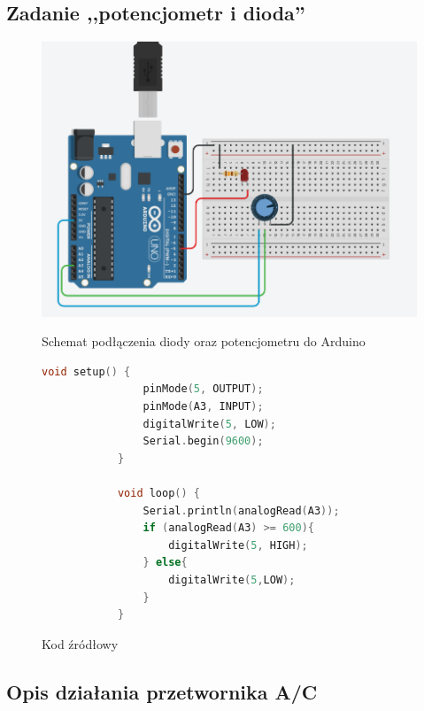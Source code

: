 \documentclass[12pt]{article}
\begin{document}
	\subsection{Zadanie ,,potencjometr i dioda''}
	\begin{figure}[h!]
		\begin{center}
			\includegraphics[scale=0.4]{03_serial_conn.png}
			\caption*{Schemat podłączenia diody oraz potencjometru do Arduino}
		\end{center}
		\begin{lstlisting}[language=C++]
			void setup() {
				pinMode(5, OUTPUT);
				pinMode(A3, INPUT);
				digitalWrite(5, LOW);
				Serial.begin(9600);
			}
			
			void loop() {
				Serial.println(analogRead(A3));
				if (analogRead(A3) >= 600){
					digitalWrite(5, HIGH);
				} else{
					digitalWrite(5,LOW);
				}
			}
		\end{lstlisting}
		\caption*{Kod źródłowy}
	\end{figure}
	\subsection{Opis działania przetwornika A/C}
	\newpage
	\begingroup
	\hypersetup{hidelinks}
	\tableofcontents
	\endgroup
\end{document}
